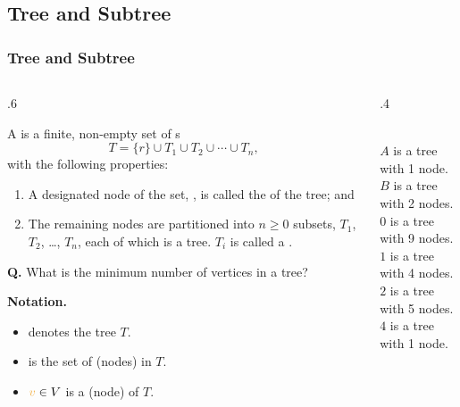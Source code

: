 \documentclass[10pt]{beamer}
\begin{document}



\subsection{Tree and Subtree}
\begin{frame}[t]\frametitle{Tree and Subtree}

	\vspace{-0.5cm}
	\begin{columns}[T] %
	\begin{column}{.6\linewidth} %
	{\footnotesize 
		\begin{definition}[Mathematical]
			A   is a finite, non-empty set of s
			\[T = \{ r \} \cup T_1 \cup T_2 \cup \cdots \cup T_n,\]
			with the following properties:
			\begin{enumerate}
			
				\item 
				A designated node of the set, ,
				is called the  of the tree; and
				
				\item 
				The remaining nodes are partitioned into $n\ge0$ subsets,
				$T_1$, $T_2$, \ldots, $T_n$,
				each of which is a tree. $T_{i}$ is called a .
			\end{enumerate}			
		\end{definition}
		
		\textbf{Q.}
		What is the minimum number of vertices in a tree?
		
		\textbf{Notation.}
		\begin{itemize}
			
			\item 
			 denotes the tree $T$.				

			\item
			 is the set of  (nodes) in $T$.
			
			\item
			$\hEmph{v}\in V$ is a  (node) of $T$.
		\end{itemize}
	} %
	\end{column} %
	\begin{column}{.4\linewidth} %
		\begin{example}
		{\scriptsize
			
			\\		
			$A$ is a tree with 1 node.\\
			$B$ is a tree with 2 nodes.\\
			$0$ is a tree with 9 nodes.\\
			$1$ is a tree with 4 nodes.\\
			$2$ is a tree with 5 nodes.\\
			$4$ is a tree with 1 node.\\		
		} %
		\end{example}


\end{column}
\end{columns}
\end{frame}
\end{document}
